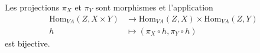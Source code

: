 \begin{proposition}
Les projections \(\pi_X\) et \(\pi_Y\) sont morphismes et
l'application
\begin{align*}
    \mathrm{Hom}_{VA} {(Z, X \times  Y)} &\longrightarrow \mathrm{Hom}_{VA}
    {(Z, X)} \times  \mathrm{Hom}_{VA} {(Z, Y)} \\
    h &\longmapsto {(\pi_X \circ h, \pi_Y \circ h)}
\end{align*} 
est bijective.
\end{proposition}






